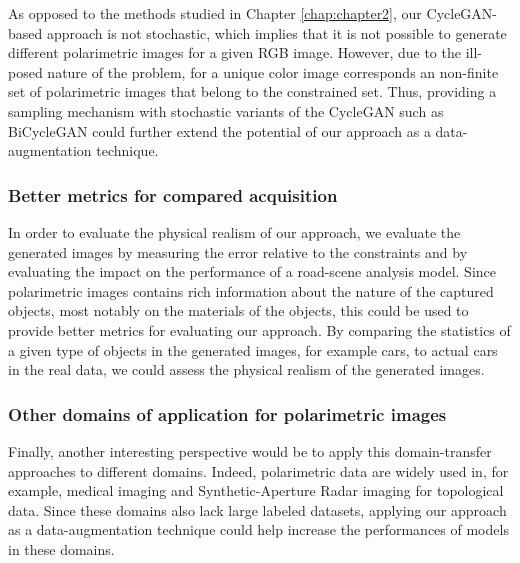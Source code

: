 As opposed to the methods studied in Chapter \ref{chap:chapter2}, our CycleGAN-based approach is not stochastic, which implies that it is not possible to generate different polarimetric images for a given RGB image. However, due to the ill-posed nature of the problem, for a unique color image corresponds an non-finite set of polarimetric images that belong to the constrained set. Thus, providing a sampling mechanism with stochastic variants of the CycleGAN such as BiCycleGAN \citep{Zhu2017b} could further extend the potential of our approach as a data-augmentation technique.

\subsubsection*{Better metrics for compared acquisition}

In order to evaluate the physical realism of our approach, we evaluate the generated images by measuring the error relative to the constraints and by evaluating the impact on the performance of a road-scene analysis model. Since polarimetric images contains rich information about the nature of the captured objects, most notably on the materials of the objects, this could be used to provide better metrics for evaluating our approach. By comparing the statistics of a given type of objects in the generated images, for example cars, to actual cars in the real data, we could assess the physical realism of the generated images.

\subsubsection*{Other domains of application for polarimetric images}

Finally, another interesting perspective would be to apply this domain-transfer approaches to different domains. Indeed, polarimetric data are widely used in, for example, medical imaging \citep{Kupinski2018, Rehbinder2016} and Synthetic-Aperture Radar \citep{vanZyl2011} imaging for topological data. Since these domains also lack large labeled datasets, applying our approach as a data-augmentation technique could help increase the performances of models  in these domains.